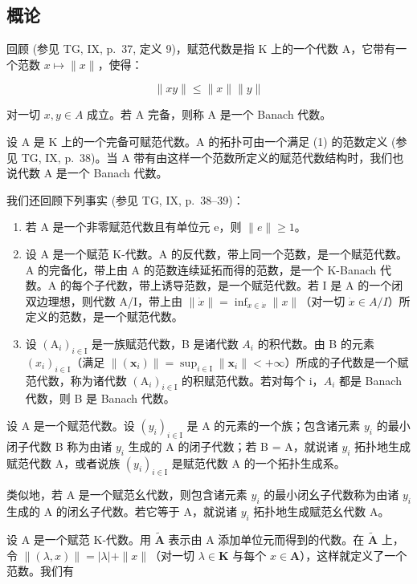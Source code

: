 \subsection{概论}

回顾 (参见 TG, IX, p.~37, 定义 9)，赋范代数是指 K 上的一个代数 A，它带有一个范数 \(x \mapsto \|x\|\)，使得：

\[
\| x y \| \leqslant \| x \| \| y \|\tag{1}
\]

对一切 \(x, y \in A\) 成立。若 A 完备，则称 A 是一个 Banach 代数。

设 A 是 K 上的一个完备可赋范代数。A 的拓扑可由一个满足 (1) 的范数定义 (参见 TG, IX, p.~38)。当 A 带有由这样一个范数所定义的赋范代数结构时，我们也说代数 A 是一个 Banach 代数。

我们还回顾下列事实 (参见 TG, IX, p.~38--39)：

\begin{enumerate}
\def\labelenumi{(\arabic{enumi})}
\item
  若 A 是一个非零赋范代数且有单位元 e，则 \(\|e\|\geqslant1\)。
\item
  设 A 是一个赋范 K-代数。A 的反代数，带上同一个范数，是一个赋范代数。A 的完备化，带上由 A 的范数连续延拓而得的范数，是一个 K-Banach 代数。A 的每个子代数，带上诱导范数，是一个赋范代数。若 I 是 A 的一个闭双边理想，则代数 A/I，带上由 \(\|\dot{x}\| = \inf_{x \in \dot{x}} \|x\|\)（对一切 \(\dot{x} \in A/I\)）所定义的范数，是一个赋范代数。
\item
  设 \((\mathrm{A}_{i})_{i\in\mathrm{I}}\) 是一族赋范代数，B 是诸代数 \(A_{i}\) 的积代数。由 B 的元素 \((x_{i})_{i\in\mathrm{I}}\)（满足 \(\|(\boldsymbol{x}_{i})\|=\sup_{i\in\mathrm{I}}\|\boldsymbol{x}_{i}\|<+\infty\)）所成的子代数是一个赋范代数，称为诸代数 \((\mathrm{A}_{i})_{i\in\mathrm{I}}\) 的积赋范代数。若对每个 i，\(A_{i}\) 都是 Banach 代数，则 B 是 Banach 代数。
\end{enumerate}

设 A 是一个赋范代数。设 \((y_{i})_{i\in\mathrm{I}}\) 是 A 的元素的一个族；包含诸元素 \(y_{i}\) 的最小闭子代数 B 称为由诸 \(y_{i}\) 生成的 A 的闭子代数；若 B = A，就说诸 \(y_{i}\) 拓扑地生成赋范代数 A，或者说族 \((y_{i})_{i\in\mathrm{I}}\) 是赋范代数 A 的一个拓扑生成系。

类似地，若 A 是一个赋范幺代数，则包含诸元素 \(y_{i}\) 的最小闭幺子代数称为由诸 \(y_{i}\) 生成的 A 的闭幺子代数。若它等于 A，就说诸 \(y_{i}\) 拓扑地生成赋范幺代数 A。

设 A 是一个赋范 K-代数。用 \(\tilde{\mathbf{A}}\) 表示由 A 添加单位元而得到的代数。在 \(\tilde{\mathbf{A}}\) 上，令 \(\| (\lambda ,x)\| = |\lambda | + \| x\|\)（对一切 \(\lambda \in \mathbf{K}\) 与每个 \(x\in \mathbf{A}\)），这样就定义了一个范数。我们有

